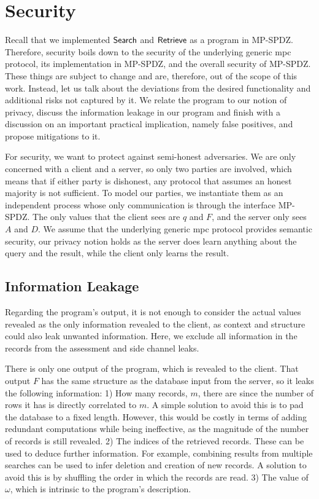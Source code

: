 \section{Security}
\label{sec:proofofconceptSecurity}

Recall that we implemented $ \mathsf{{Search}} $ and $ \mathsf{{Retrieve}} $ as a program in MP-SPDZ. Therefore, security boils down to the security of the underlying generic \acrshort{mpc} protocol, its implementation in MP-SPDZ, and the overall security of MP-SPDZ. These things are subject to change and are, therefore, out of the scope of this work. Instead, let us talk about the deviations from the desired functionality and additional risks not captured by it. We relate the program to our notion of privacy, discuss the information leakage in our program and finish with a discussion on an important practical implication, namely false positives, and propose mitigations to it.  

For security, we want to protect against semi-honest adversaries. We are only concerned with a client and a server, so only two parties are involved, which means that if either party is dishonest, any protocol that assumes an honest majority is not sufficient. To model our parties, we instantiate them as an independent process whose only communication is through the interface MP-SPDZ. The only values that the client sees are $ q $ and $ F $, and the server only sees $ A $ and $ D $. We assume that the underlying generic \acrshort{mpc} protocol provides semantic security, our privacy notion holds as the server does learn anything about the query and the result, while the client only learns the result.

\subsection*{\thesubsection\quad Information Leakage}\label{subsec:ProofOfConceptInformationLeakage}


Regarding the program's output, it is not enough to consider the actual values revealed as the only information revealed to the client, as context and structure could also leak unwanted information. Here, we exclude all information in the records from the assessment and side channel leaks.

There is only one output of the program, which is revealed to the client. That output $ F $ has the same structure as the database input from the server, so it leaks the following information: 1) How many records, $ m $, there are since the number of rows it has is directly correlated to $ m $. A simple solution to avoid this is to pad the database to a fixed length. However, this would be costly in terms of adding redundant computations while being ineffective, as the magnitude of the number of records is still revealed. 2) The indices of the retrieved records. These can be used to deduce further information. For example, combining results from multiple searches can be used to infer deletion and creation of new records. A solution to avoid this is by shuffling the order in which the records are read. 3) The value of $ \omega $, which is intrinsic to the program's description.


